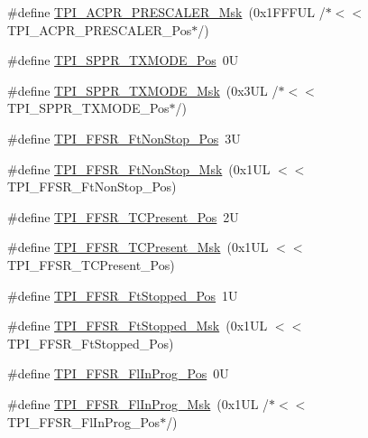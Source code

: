 \begin{DoxyCompactItemize}
\#define \hyperlink{group___c_m_s_i_s___t_p_i_ga4fcacd27208419929921aec8457a8c13}{T\+P\+I\+\_\+\+A\+C\+P\+R\+\_\+\+P\+R\+E\+S\+C\+A\+L\+E\+R\+\_\+\+Msk}~(0x1\+F\+F\+F\+U\+L /$\ast$$<$$<$ T\+P\+I\+\_\+\+A\+C\+P\+R\+\_\+\+P\+R\+E\+S\+C\+A\+L\+E\+R\+\_\+\+Pos$\ast$/)
\item 
\#define \hyperlink{group___c_m_s_i_s___t_p_i_ga0f302797b94bb2da24052082ab630858}{T\+P\+I\+\_\+\+S\+P\+P\+R\+\_\+\+T\+X\+M\+O\+D\+E\+\_\+\+Pos}~0U
\item 
\#define \hyperlink{group___c_m_s_i_s___t_p_i_gaca085c8a954393d70dbd7240bb02cc1f}{T\+P\+I\+\_\+\+S\+P\+P\+R\+\_\+\+T\+X\+M\+O\+D\+E\+\_\+\+Msk}~(0x3\+U\+L /$\ast$$<$$<$ T\+P\+I\+\_\+\+S\+P\+P\+R\+\_\+\+T\+X\+M\+O\+D\+E\+\_\+\+Pos$\ast$/)
\item 
\#define \hyperlink{group___c_m_s_i_s___t_p_i_ga9537b8a660cc8803f57cbbee320b2fc8}{T\+P\+I\+\_\+\+F\+F\+S\+R\+\_\+\+Ft\+Non\+Stop\+\_\+\+Pos}~3U
\item 
\#define \hyperlink{group___c_m_s_i_s___t_p_i_gaaa313f980974a8cfc7dac68c4d805ab1}{T\+P\+I\+\_\+\+F\+F\+S\+R\+\_\+\+Ft\+Non\+Stop\+\_\+\+Msk}~(0x1\+U\+L $<$$<$ T\+P\+I\+\_\+\+F\+F\+S\+R\+\_\+\+Ft\+Non\+Stop\+\_\+\+Pos)
\item 
\#define \hyperlink{group___c_m_s_i_s___t_p_i_gad30fde0c058da2ffb2b0a213be7a1b5c}{T\+P\+I\+\_\+\+F\+F\+S\+R\+\_\+\+T\+C\+Present\+\_\+\+Pos}~2U
\item 
\#define \hyperlink{group___c_m_s_i_s___t_p_i_ga0d6bfd263ff2fdec72d6ec9415fb1135}{T\+P\+I\+\_\+\+F\+F\+S\+R\+\_\+\+T\+C\+Present\+\_\+\+Msk}~(0x1\+U\+L $<$$<$ T\+P\+I\+\_\+\+F\+F\+S\+R\+\_\+\+T\+C\+Present\+\_\+\+Pos)
\item 
\#define \hyperlink{group___c_m_s_i_s___t_p_i_gaedf31fd453a878021b542b644e2869d2}{T\+P\+I\+\_\+\+F\+F\+S\+R\+\_\+\+Ft\+Stopped\+\_\+\+Pos}~1U
\item 
\#define \hyperlink{group___c_m_s_i_s___t_p_i_ga1ab6c3abe1cf6311ee07e7c479ce5f78}{T\+P\+I\+\_\+\+F\+F\+S\+R\+\_\+\+Ft\+Stopped\+\_\+\+Msk}~(0x1\+U\+L $<$$<$ T\+P\+I\+\_\+\+F\+F\+S\+R\+\_\+\+Ft\+Stopped\+\_\+\+Pos)
\item 
\#define \hyperlink{group___c_m_s_i_s___t_p_i_ga542ca74a081588273e6d5275ba5da6bf}{T\+P\+I\+\_\+\+F\+F\+S\+R\+\_\+\+Fl\+In\+Prog\+\_\+\+Pos}~0U
\item 
\#define \hyperlink{group___c_m_s_i_s___t_p_i_ga63dfb09259893958962914fc3a9e3824}{T\+P\+I\+\_\+\+F\+F\+S\+R\+\_\+\+Fl\+In\+Prog\+\_\+\+Msk}~(0x1\+U\+L /$\ast$$<$$<$ T\+P\+I\+\_\+\+F\+F\+S\+R\+\_\+\+Fl\+In\+Prog\+\_\+\+Pos$\ast$/)
\item 
$$
\end{DoxyCompactItemize}
